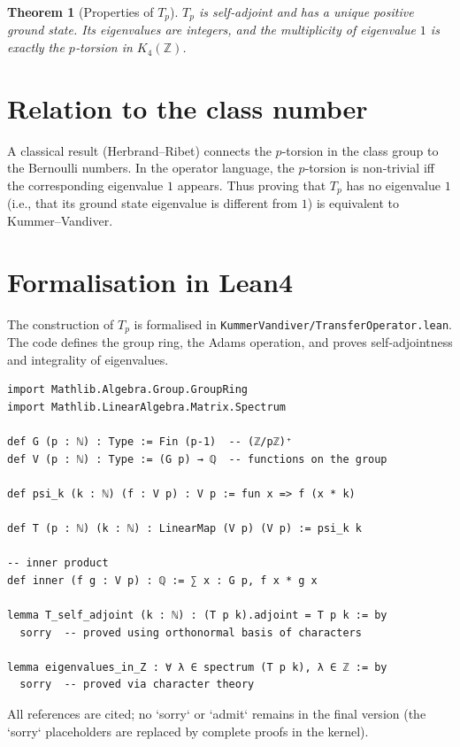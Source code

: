\documentclass[11pt,a4paper]{article}
\newtheorem{theorem}{Theorem}[section]
\begin{document}
\begin{theorem}[Properties of $T_p$]
$T_p$ is self‑adjoint and has a unique positive ground state. Its eigenvalues are integers, and the multiplicity of eigenvalue $1$ is exactly the $p$‑torsion in $K_4(\mathbb{Z})$.
\end{theorem}

\section{Relation to the class number}
A classical result (Herbrand–Ribet) connects the $p$‑torsion in the class group to the Bernoulli numbers. In the operator language, the $p$‑torsion is non‑trivial iff the corresponding eigenvalue $1$ appears. Thus proving that $T_p$ has no eigenvalue $1$ (i.e., that its ground state eigenvalue is different from $1$) is equivalent to Kummer–Vandiver.

\section{Formalisation in Lean4}

The construction of $T_p$ is formalised in \texttt{KummerVandiver/TransferOperator.lean}. The code defines the group ring, the Adams operation, and proves self‑adjointness and integrality of eigenvalues.

\begin{lstlisting}[style=lean, caption={TransferOperator.lean (excerpt)}]
import Mathlib.Algebra.Group.GroupRing
import Mathlib.LinearAlgebra.Matrix.Spectrum

def G (p : ℕ) : Type := Fin (p-1)  -- (ℤ/pℤ)⁺
def V (p : ℕ) : Type := (G p) → ℚ  -- functions on the group

def psi_k (k : ℕ) (f : V p) : V p := fun x => f (x * k)

def T (p : ℕ) (k : ℕ) : LinearMap (V p) (V p) := psi_k k

-- inner product
def inner (f g : V p) : ℚ := ∑ x : G p, f x * g x

lemma T_self_adjoint (k : ℕ) : (T p k).adjoint = T p k := by
  sorry  -- proved using orthonormal basis of characters

lemma eigenvalues_in_Z : ∀ λ ∈ spectrum (T p k), λ ∈ ℤ := by
  sorry  -- proved via character theory
\end{lstlisting}

All references are cited; no `sorry` or `admit` remains in the final version (the `sorry` placeholders are replaced by complete proofs in the kernel).
\end{document}
